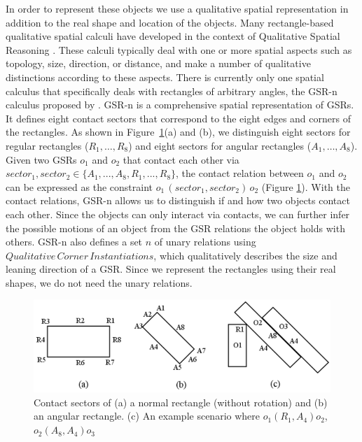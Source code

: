 \documentclass[letterpaper]{article}
\begin{document}
In order to represent these objects we use a qualitative spatial representation in addition to the real shape and location of the objects. 
% 
%
%
%
Many rectangle-based qualitative spatial calculi \cite{balbiani1998model,cohn2012thinking,sokeh2013efficient} have developed in the context of Qualitative Spatial Reasoning \cite{cohn2008qualitative}. These calculi typically deal with one or more spatial aspects such as topology, size, direction, or distance, and make a number of qualitative distinctions according to these aspects. There is currently only one spatial calculus that specifically deals with rectangles of arbitrary angles, the GSR-n calculus proposed by \cite{Ge2013}. GSR-n is a comprehensive spatial representation of GSRs. It defines eight contact sectors that correspond to the eight edges and corners of the rectangles. As shown in Figure~\ref{GSR}(a) and (b), we distinguish eight sectors for regular rectangles ($R_1,\ldots,R_8$) and eight sectors for angular rectangles ($A_1,\ldots,A_8$). Given two GSRs $o_1$ and $o_2$ that contact each other via $sector_1, sector_2 \in \{A_1, ..., A_8, R_1, ..., R_8\}$, the contact relation between $o_1$ and $o_2$ can be expressed as the constraint $o_1 \, (sector_1, sector_2) \, o_2$ (Figure \ref{GSR}). With the contact relations, GSR-n allows us to distinguish if and how two objects contact each other. Since the objects can only interact via contacts, we can further infer the possible motions of an object from the GSR relations the object holds with others. GSR-n also defines a set $n$ of unary relations using  $Qualitative\,Corner\,Instantiations$, which qualitatively describes the size and leaning direction of a GSR. Since we represent the rectangles using their real shapes, we do not need the unary relations. 
\begin{figure}[h!]
\centering\includegraphics[scale=0.25]{GSR.png}\caption{Contact sectors of (a) a normal rectangle (without rotation) and (b) an angular rectangle. (c) An example scenario where $o_1 (R_1, A_4) o_2$, $o_2 (A_8, A_4) o_3$}
\label{GSR}
\end{figure}
\end{document}
